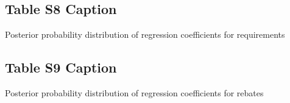 \documentclass[draft]{agujournal}
\begin{document}
\subsection*{Table S8 Caption}
\setcounter{table}{7}%
\begin{table}[H]
\centering
\caption{Posterior probability distribution of regression coefficients for requirements}
\end{table}


\subsection*{Table S9 Caption}
\setcounter{table}{8}%
\begin{table}[H]
\centering
\caption{Posterior probability distribution of regression coefficients for rebates}
\end{table}
\end{document}
